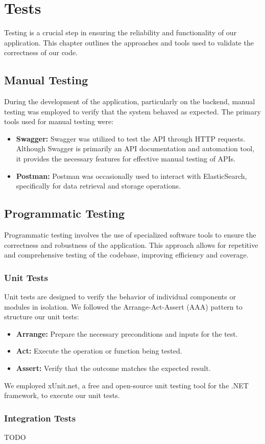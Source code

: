 \chapter{Tests} \label{cap:tests}

Testing is a crucial step in ensuring the reliability and functionality of our application. This chapter outlines the approaches and tools used to validate the correctness of our code.

\section{Manual Testing}

During the development of the application, particularly on the backend, manual testing was employed to verify that the system behaved as expected. The primary tools used for manual testing were:

\begin{itemize} 
	\item \textbf{Swagger:} Swagger was utilized to test the API through HTTP requests. Although Swagger is primarily an API documentation and automation tool, it provides the necessary features for effective manual testing of APIs. 
	\item \textbf{Postman:} Postman was occasionally used to interact with ElasticSearch, specifically for data retrieval and storage operations. 
\end{itemize}

\section{Programmatic Testing}
Programmatic testing involves the use of specialized software tools to ensure the correctness and robustness of the application. This approach allows for repetitive and comprehensive testing of the codebase, improving efficiency and coverage.

\subsection{Unit Tests}
Unit tests are designed to verify the behavior of individual components or modules in isolation. We followed the Arrange-Act-Assert (AAA) pattern to structure our unit tests:

\begin{itemize} 
	\item \textbf{Arrange:} Prepare the necessary preconditions and inputs for the test. 
	\item \textbf{Act:} Execute the operation or function being tested. 
	\item \textbf{Assert:} Verify that the outcome matches the expected result. 
\end{itemize}

We employed xUnit.net, a free and open-source unit testing tool for the .NET framework, to execute our unit tests.

\subsection{Integration Tests}

TODO